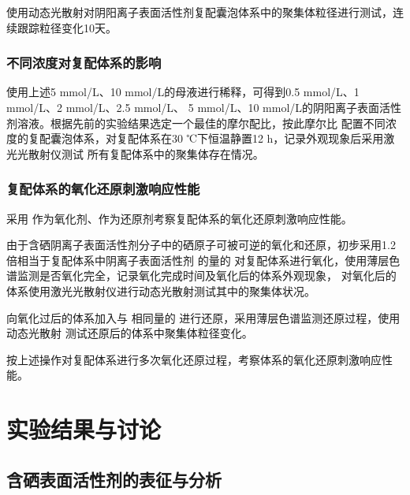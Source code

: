 \documentclass[bachelor,winfonts,replaceperiod]{jnuthesis}
\begin{document}
    使用动态光散射对阴阳离子表面活性剂复配囊泡体系中的聚集体粒径进行测试，连续跟踪粒径变化10天。
    
    \subsection{不同浓度对复配体系的影响}
    使用上述5 mmol/L、10 mmol/L的母液进行稀释，可得到0.5 mmol/L、1 mmol/L、2 mmol/L、2.5 mmol/L、
    5 mmol/L、10 mmol/L的阴阳离子表面活性剂溶液。根据先前的实验结果选定一个最佳的摩尔配比，按此摩尔比
    配置不同浓度的复配囊泡体系，对复配体系在30 ℃下恒温静置12 h，记录外观现象后采用激光光散射仪测试
    所有复配体系中的聚集体存在情况。
    
    \subsection{复配体系的氧化还原刺激响应性能}
    采用 作为氧化剂、作为还原剂考察复配体系的氧化还原刺激响应性能。
    
    由于含硒阴离子表面活性剂分子中的硒原子可被可逆的氧化和还原，初步采用1.2倍相当于复配体系中阴离子表面活性剂
    的量的  对复配体系进行氧化，使用薄层色谱监测是否氧化完全，记录氧化完成时间及氧化后的体系外观现象，
    对氧化后的体系使用激光光散射仪进行动态光散射测试其中的聚集体状况。
    
    向氧化过后的体系加入与  相同量的  进行还原，采用薄层色谱监测还原过程，使用动态光散射
    测试还原后的体系中聚集体粒径变化。
    
    按上述操作对复配体系进行多次氧化还原过程，考察体系的氧化还原刺激响应性能。
    
    \chapter{实验结果与讨论}\label{chapter:results}
    \section{含硒表面活性剂的表征与分析}
\end{document}
